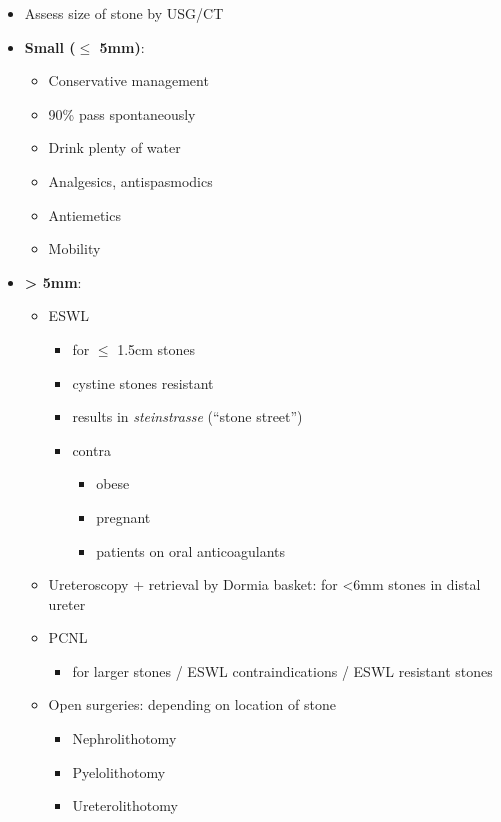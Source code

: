 \documentclass[
  14pt,
]{memoir}
\providecommand{\tightlist}{%
  \setlength{\itemsep}{0pt}\setlength{\parskip}{0pt}}
\begin{document}
\begin{itemize}
\tightlist
\item
  Assess size of stone by USG/CT
\item
  \textbf{Small (\(\le\) 5mm)}:

  \begin{itemize}
  \tightlist
  \item
    Conservative management
  \item
    90\% pass spontaneously
  \item
    Drink plenty of water
  \item
    Analgesics, antispasmodics
  \item
    Antiemetics
  \item
    Mobility
  \end{itemize}
\item
  \textbf{\textgreater{} 5mm}:

  \begin{itemize}
  \tightlist
  \item
    ESWL

    \begin{itemize}
    \tightlist
    \item
      for \(\le\) 1.5cm stones
    \item
      cystine stones resistant
    \item
      results in \emph{steinstrasse} (``stone street'')
    \item
      contra

      \begin{itemize}
      \tightlist
      \item
        obese
      \item
        pregnant
      \item
        patients on oral anticoagulants
      \end{itemize}
    \end{itemize}
  \item
    Ureteroscopy + retrieval by Dormia basket: for \textless6mm stones
    in distal ureter
  \item
    PCNL

    \begin{itemize}
    \tightlist
    \item
      for larger stones / ESWL contraindications / ESWL resistant stones
    \end{itemize}
  \item
    Open surgeries: depending on location of stone

    \begin{itemize}
    \tightlist
    \item
      Nephrolithotomy
    \item
      Pyelolithotomy
    \item
      Ureterolithotomy
    \end{itemize}
  \end{itemize}
\end{itemize}
\end{document}
